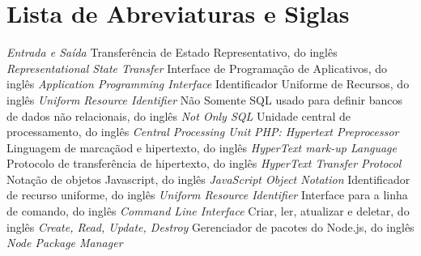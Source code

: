 \chapter*{Lista de Abreviaturas e Siglas}


\begin{acronym}
 {\textit{Entrada e Saída}}
 {Transferência de Estado Representativo, do inglês \textit{Representational State Transfer}}
 {Interface de Programação de Aplicativos, do inglês \textit{Application Programming Interface}}
 {Identificador Uniforme de Recursos, do inglês \textit{Uniform Resource Identifier}}
 {Não Somente SQL usado para definir bancos de dados não relacionais, do inglês \textit{Not Only SQL}}
 {Unidade central de processamento, do inglês \textit{Central Processing Unit}}
 {\textit{PHP: Hypertext Preprocessor}}
 {Linguagem de marcaçãod e hipertexto, do inglês \textit{HyperText mark-up Language}}
 {Protocolo de transferência de hipertexto, do inglês \textit{HyperText Transfer Protocol}}
 {Notação de objetos Javascript, do inglês \textit{JavaScript Object Notation}}
 {Identificador de recurso uniforme, do inglês \textit{Uniform Resource Identifier}}
 {Interface para a linha de comando, do inglês \textit{Command Line Interface}}
 {Criar, ler, atualizar e deletar, do inglês \textit{Create, Read, Update, Destroy}}
 {Gerenciador de pacotes do Node.js, do inglês \textit{Node Package Manager}}




\end{acronym}
